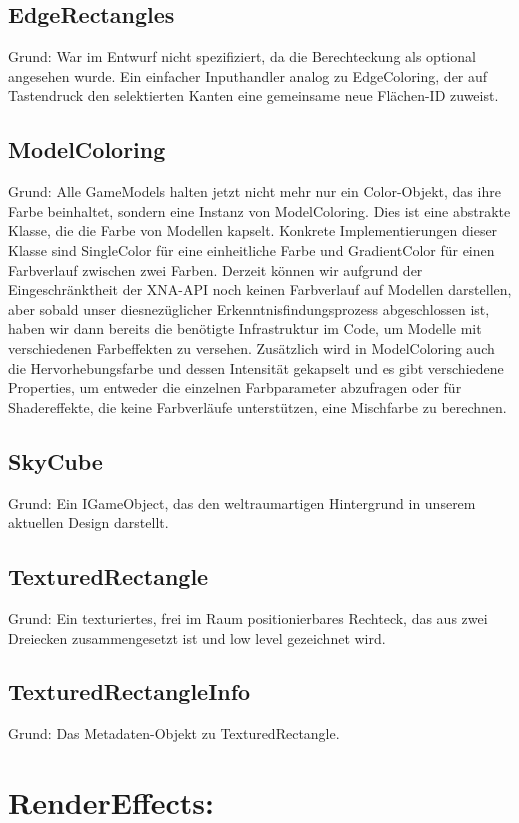 \subsection{EdgeRectangles}
Grund: War im Entwurf nicht spezifiziert, da die Berechteckung als optional angesehen wurde. Ein einfacher Inputhandler analog zu EdgeColoring, der auf Tastendruck den selektierten Kanten eine gemeinsame neue Flächen-ID zuweist.
\subsection{ModelColoring}
Grund: Alle GameModels halten jetzt nicht mehr nur ein Color-Objekt, das ihre Farbe beinhaltet, sondern eine Instanz von ModelColoring. Dies ist eine abstrakte Klasse, die die Farbe von Modellen kapselt. Konkrete Implementierungen dieser Klasse sind SingleColor für eine einheitliche Farbe und GradientColor für einen Farbverlauf zwischen zwei Farben. Derzeit können wir aufgrund der Eingeschränktheit der XNA-API noch keinen Farbverlauf auf Modellen darstellen, aber sobald unser diesnezüglicher Erkenntnisfindungsprozess abgeschlossen ist, haben wir dann bereits die benötigte Infrastruktur im Code, um Modelle mit verschiedenen Farbeffekten zu versehen. Zusätzlich wird in ModelColoring auch die Hervorhebungsfarbe und dessen Intensität gekapselt und es gibt verschiedene Properties, um entweder die einzelnen Farbparameter abzufragen oder für Shadereffekte, die keine Farbverläufe unterstützen, eine Mischfarbe zu berechnen.
\subsection{SkyCube}
Grund: Ein IGameObject, das den weltraumartigen Hintergrund in unserem aktuellen Design darstellt.
\subsection{TexturedRectangle}
Grund: Ein texturiertes, frei im Raum positionierbares Rechteck, das aus zwei Dreiecken zusammengesetzt ist und low level gezeichnet wird.
\subsection{TexturedRectangleInfo}
Grund: Das Metadaten-Objekt zu TexturedRectangle.

\section{RenderEffects:}

